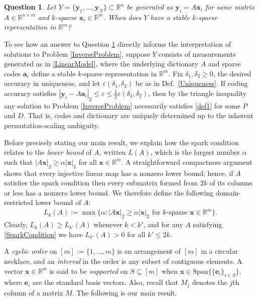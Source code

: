 \documentclass[journal, twocolumn]{IEEEtran}
\newtheorem{question}{Question}
\begin{document}
\begin{question}\label{DUTproblem}
Let $Y = \{\mathbf{y}_1, \ldots, \mathbf{y}_N \} \subset \mathbb{R}^n$ be generated as $\mathbf{y}_i = A\mathbf{x}_i$ for some matrix $A \in \mathbb{R}^{n \times m}$ and $k$-sparse $\mathbf{x}_i \in \mathbb{R}^m$. When does $Y$ have a stable $k$-sparse representation in $\mathbb{R}^m$?
\end{question}

To see how an answer to Question \ref{DUTproblem} directly informs the interpretation of solutions to Problem \ref{InverseProblem}, suppose $Y$ consists of measurements generated as in \eqref{LinearModel}, where the underlying dictionary $A$ and sparse codes $\mathbf{a}_i$ define a stable $k$-sparse representation in $\mathbb{R}^m$. Fix $\delta_1, \delta_2 \geq 0$, the desired accuracy in uniqueness, and let $\varepsilon(\delta_1, \delta_2)$ be as in Def.~\ref{Uniqueness}. 
If coding accuracy satisfies $|\mathbf{y}_i - A\mathbf{a}_i|_2 \leq \varepsilon \leq \frac{1}{2}\varepsilon(\delta_1, \delta_2)$, then by the triangle inequality any solution to Problem \ref{InverseProblem} necessarily satisfies \eqref{def1} for some $P$ and $D$. That is, codes and dictionary are uniquely determined up to the inherent permutation-scaling ambiguity.  %

Before precisely stating our main result, we explain how the spark condition relates to the \emph{lower bound} \cite{Grcar10} of $A$, written $L(A)$, which is the largest number $\alpha$ such that $|A\mathbf{x}|_2 \geq \alpha|\mathbf{x}|_2$ for all $\mathbf{x} \in \mathbb{R}^m$. A straightforward compactness argument shows that every injective linear map has a nonzero lower bound; hence, if $A$ satisfies the spark condition then every submatrix formed from $2k$ of its columns or less has a nonzero lower bound. We therefore define the following domain-restricted lower bound of $A$:
\begin{align}
L_k(A) := \max \{ \alpha : |A\mathbf{x}|_2 \geq \alpha|\mathbf{x}|_2 \text{ for $k$-sparse } \mathbf{x} \in \mathbb{R}^m\}.
\end{align} 
Clearly, $L_k(A) \geq L_{k'}(A)$ whenever $k < k'$, and for any $A$ satisfying \eqref{SparkCondition} we have $L_{k'}(A) > 0$ for all $k' \leq 2k$. 

A \textit{cyclic order} on $[m] := \{1, \ldots,m\}$ is an arrangement of $[m]$ in a circular necklace, and an \textit{interval} in the order is any subset of contiguous elements. A vector $\mathbf{x} \in \mathbb{R}^m$ is said to be \emph{supported} on $S \subseteq [m]$ when $\mathbf{x} \in \text{Span}\{ \{\mathbf{e}_i\}_{i\in S}\}$, where $\mathbf{e}_i$ are the standard basis vectors.  Also, recall that $M_j$ denotes the $j$th column of a matrix $M$. The following is our main result.
\end{document}
